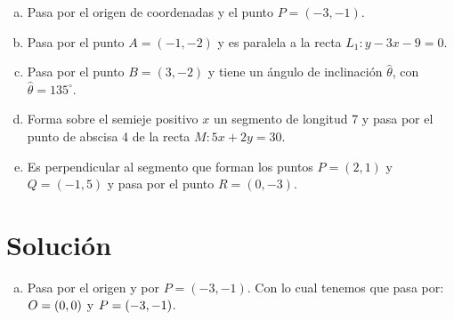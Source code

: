 \documentclass[11pt]{article}
\newcommand{\indicador}[4]{
{\tikz[remember picture,overlay]\coordinate (#1) at #2;}{\tikz[remember picture,overlay]\coordinate (#3) at #4;} 
}
\begin{document}
\begin{enumerate}[\hspace{-5mm} 1) ]
\begin{enumerate}[(a)]
    \item Pasa por el origen de coordenadas y el punto $P = (-3,-1)$.
    \item  Pasa por el punto $A = (-1,-2)$ y es paralela a la recta $L_1 : y - 3x - 9 = 0$.
    \item  Pasa por el punto $B = (3,-2)$ y tiene un ángulo de inclinación $\hat{\theta}$, con $\hat{\theta} = 135^\circ$.
    \item  Forma sobre el semieje positivo $x$ un segmento de longitud 7 y pasa por el punto de abscisa 4 de la recta $M : 5x + 2y = 30$.
    \item  Es perpendicular al segmento que forman los puntos $P = (2,1)$ y $Q = (-1,5)$ y pasa por el punto $R = (0,-3)$.
\end{enumerate}





\section*{Solución}

\begin{enumerate}[(a)]
\item Pasa por el origen y por $P = (-3,-1)$. Con lo cual tenemos que pasa por: $O=(0\indicador{a}{(-.1,-.1)}{a1}{(0,-.4)} ,0\indicador{b}{(-.1,-.1)}{b1}{(.1,-.4)})$ y $P = (-3\indicador{x}{(-.1,-.1)}{x1}{(.1,-.4)},-1\indicador{y}{(-.1,-.1)}{y1}{(.1,-.4)})$.


\end{enumerate}
\end{enumerate}
\end{document}
